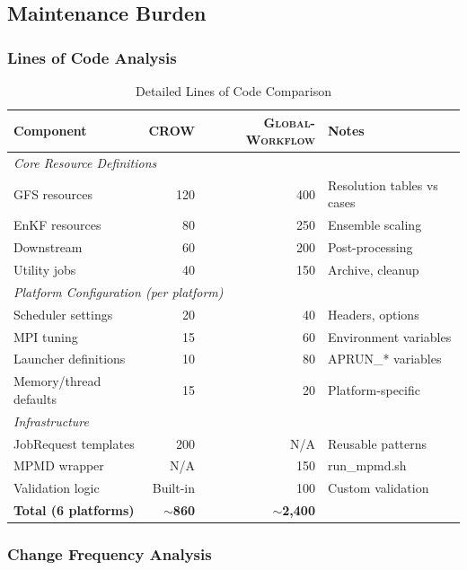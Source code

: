 \documentclass[11pt,twoside]{article}
\newcommand{\crow}{\textsc{CROW}}
\newcommand{\gw}{\textsc{Global-Workflow}}
\begin{document}
\subsection{Maintenance Burden}

\subsubsection{Lines of Code Analysis}

\begin{table}[H]
\centering
\caption{Detailed Lines of Code Comparison}
\label{tab:loc-detail}
\begin{tabular}{@{}lrrp{4cm}@{}}
\toprule
\textbf{Component} & \textbf{\crow{}} & \textbf{\gw{}} & \textbf{Notes} \\
\midrule
\multicolumn{4}{l}{\textit{Core Resource Definitions}} \\
\quad GFS resources & 120 & 400 & Resolution tables vs cases \\
\quad EnKF resources & 80 & 250 & Ensemble scaling \\
\quad Downstream & 60 & 200 & Post-processing \\
\quad Utility jobs & 40 & 150 & Archive, cleanup \\
\midrule
\multicolumn{4}{l}{\textit{Platform Configuration (per platform)}} \\
\quad Scheduler settings & 20 & 40 & Headers, options \\
\quad MPI tuning & 15 & 60 & Environment variables \\
\quad Launcher definitions & 10 & 80 & APRUN\_* variables \\
\quad Memory/thread defaults & 15 & 20 & Platform-specific \\
\midrule
\multicolumn{4}{l}{\textit{Infrastructure}} \\
\quad JobRequest templates & 200 & N/A & Reusable patterns \\
\quad MPMD wrapper & N/A & 150 & run\_mpmd.sh \\
\quad Validation logic & Built-in & 100 & Custom validation \\
\midrule
\textbf{Total (6 platforms)} & \textbf{$\sim$860} & \textbf{$\sim$2,400} & \\
\bottomrule
\end{tabular}
\end{table}

\subsubsection{Change Frequency Analysis}
\end{document}
